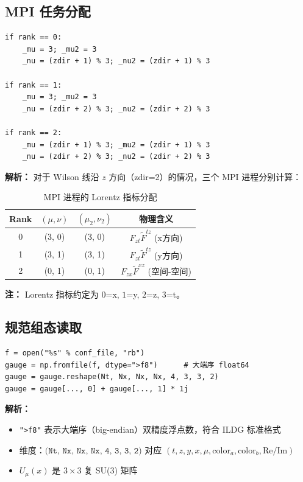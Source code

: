 \documentclass[12pt,a4paper]{ctexart}
\begin{document}
\subsection{MPI 任务分配}

\begin{lstlisting}[caption={MPI 任务分配：三种 Lorentz 分量}]
if rank == 0:
    _mu = 3; _mu2 = 3
    _nu = (zdir + 1) % 3; _nu2 = (zdir + 1) % 3

if rank == 1:
    _mu = 3; _mu2 = 3
    _nu = (zdir + 2) % 3; _nu2 = (zdir + 2) % 3

if rank == 2:
    _mu = (zdir + 1) % 3; _mu2 = (zdir + 1) % 3
    _nu = (zdir + 2) % 3; _nu2 = (zdir + 2) % 3
\end{lstlisting}

\textbf{解析：}
对于 Wilson 线沿 $z$ 方向（zdir=2）的情况，三个 MPI 进程分别计算：

\begin{table}[H]
\centering
\caption{MPI 进程的 Lorentz 指标分配}
\begin{tabular}{cccc}
\toprule
\textbf{Rank} & $(\mu, \nu)$ & $(\mu_2, \nu_2)$ & \textbf{物理含义} \\
\midrule
0 & (3, 0) & (3, 0) & $F_{zt} \tilde{F}^{tz}$ (x方向) \\
1 & (3, 1) & (3, 1) & $F_{zt} \tilde{F}^{tz}$ (y方向) \\
2 & (0, 1) & (0, 1) & $F_{zx} \tilde{F}^{xz}$ (空间-空间) \\
\bottomrule
\end{tabular}
\end{table}

\textbf{注：} Lorentz 指标约定为 $0$=x, $1$=y, $2$=z, $3$=t。

\subsection{规范组态读取}

\begin{lstlisting}[caption={读取规范组态（ILDG 格式）}]
f = open("%s" % conf_file, "rb")
gauge = np.fromfile(f, dtype=">f8")      # 大端序 float64
gauge = gauge.reshape(Nt, Nx, Nx, Nx, 4, 3, 3, 2)
gauge = gauge[..., 0] + gauge[..., 1] * 1j
\end{lstlisting}

\textbf{解析：}
\begin{itemize}
    \item \texttt{">f8"} 表示大端序（big-endian）双精度浮点数，符合 ILDG 标准格式
    \item 维度：$\texttt{(Nt, Nx, Nx, Nx, 4, 3, 3, 2)}$ 对应 $(t, z, y, x, \mu, \text{color}_a, \text{color}_b, \text{Re/Im})$
    \item $U_\mu(x)$ 是 $3 \times 3$ 复 SU(3) 矩阵
\end{itemize}
\end{document}

